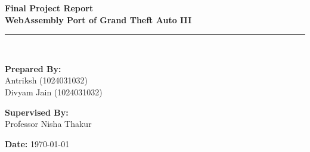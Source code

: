 \documentclass[12pt,a4paper]{article}
\begin{document}
\begin{titlepage}
    \centering
    \vspace*{1.5cm}
    
    {\Huge \textbf{Final Project Report}} \\[0.5cm]
    {\Large \textbf{WebAssembly Port of Grand Theft Auto III}} \\
    
    \vspace{1.5cm}
    \rule{\linewidth}{1pt} \\
    \vspace{1.5cm}
    
    \begin{minipage}{0.48\textwidth}
        \begin{flushleft} \large
            \textbf{Prepared By:}\\
            Antriksh (1024031032)\\
            Divyam Jain (1024031032)
        \end{flushleft}
    \end{minipage}
    \begin{minipage}{0.48\textwidth}
        \begin{flushright} \large
            \textbf{Supervised By:}\\
            Professor Nisha Thakur
        \end{flushright}
    \end{minipage}

    \vfill

    {\large \textbf{Date:} \today}
\end{titlepage}

\begin{abstract}
\noindent This report details the prototype implementation of porting Grand Theft Auto III to the web browser utilizing WebAssembly (WASM), WebGL 2.0, and the Emscripten toolchain based on the open-source reverse-engineered engine codebase (\texttt{re3}). The project aims to eliminate the need for native platform binaries or external installations by executing legacy C++ game engines natively inside modern web browsers. This prototype demonstrates successful compilation of core C++ engine components, basic WebGL graphics context initialization, asynchronous asset fetching over HTTP, and frame-rate synchronization within browser execution contexts.
\end{abstract}

\newpage
\end{document}
